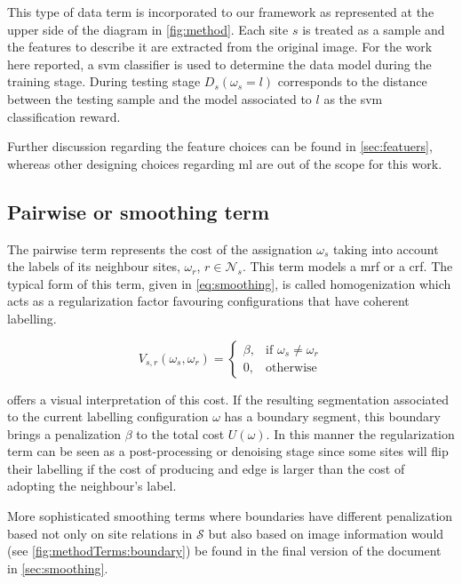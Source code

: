 This type of data term is incorporated to our framework as represented at the upper side of the diagram in \cref{fig:method}.
Each site $s$ is treated as a sample and the features to describe it are extracted from the original image. 
For the work here reported, a \ac{svm} classifier is used to determine the data model during the training stage.
During testing stage $D_s(\omega_s=l)$ corresponds to the distance between the testing sample and the model associated to $l$ as the \ac{svm} classification reward. 

Further discussion regarding the feature choices can be found in \cref{sec:featuers}, whereas other designing choices regarding \ac{ml} are out of the scope for this work.

\subsection{Pairwise or smoothing term} \label{sec:method:mrfTerm}
 
The pairwise term represents the cost of the assignation $\omega_s$ taking into account the labels of its neighbour sites, $\omega_r$, $r \in \mathcal{N}_{s}$. 
This term models a \ac{mrf} or a \ac{crf}.
The typical form of this term, given in \cref{eq:smoothing}, is called homogenization which acts as a regularization factor favouring configurations that have coherent labelling.

\begin{equation}
V_{s,r}(\omega_s,\omega_r) = 
\begin{cases}
    \beta, & \text{if } \omega_s \ne \omega_r\\
    0,              & \text{otherwise}
\end{cases}
\label{eq:smoothing}
\end{equation}

 offers a visual interpretation of this cost.
If the resulting segmentation associated to the current labelling configuration $\omega$ has a boundary segment, this boundary brings a penalization $\beta$ to the total cost $U(\omega)$.
In this manner the regularization term can be seen as a post-processing or denoising stage since some sites will flip their labelling if the cost of producing and edge is larger than the cost of adopting the neighbour's label. 

More sophisticated smoothing terms where boundaries have different penalization based not only on site relations in $\mathcal{S}$ but also based on image information would (see \cref{fig:methodTerms:boundary}) be found in the final version of the document in \cref{sec:smoothing}.

